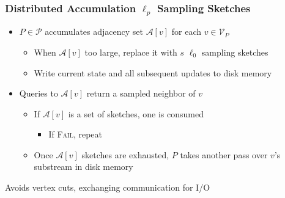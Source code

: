 \documentclass{beamer}
\newcommand{\algoname}[1]{\textnormal{\textsc{#1}}}
\begin{document}
\begin{frame}
\frametitle{Distributed Accumulation $\ell_p$ Sampling Sketches}

\begin{itemize}
	\item $P \in \mathcal{P}$ accumulates adjacency set $\mathcal{A}[v]$ for each $v \in \mathcal{V}_P$ %
	\begin{itemize}
		\item When $\mathcal{A}[v]$ too large, replace it with $s$ $\ell_0$ sampling sketches
		\item Write current state and all subsequent updates to disk memory %
	\end{itemize}
	\item Queries to $\mathcal{A}[v]$ return a sampled neighbor of $v$
	\begin{itemize}
		\item If $\mathcal{A}[v]$ is a set of sketches, one is consumed
		\begin{itemize}
			\item If \algoname{Fail}, repeat		
		\end{itemize}
		\item Once $\mathcal{A}[v]$ sketches are exhausted, $P$ takes another pass over $v$'s substream in disk memory
	\end{itemize}
\end{itemize}

\begin{block}{}
\begin{center}
Avoids vertex cuts, exchanging communication for I/O
\end{center}
\end{block}

\end{frame}

\end{document}
